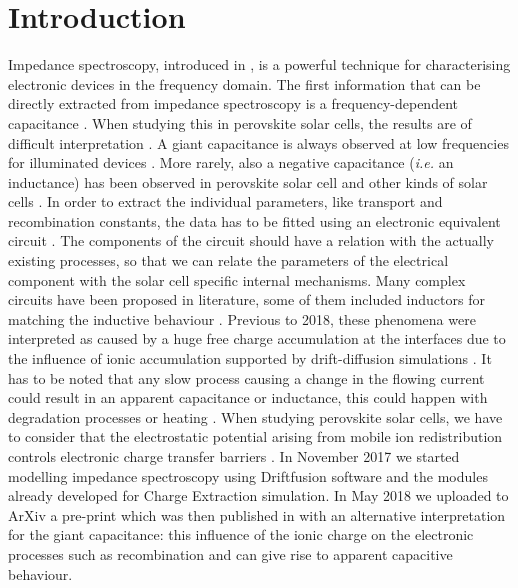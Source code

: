 
\section{Introduction}
	Impedance spectroscopy, introduced in , is a powerful technique for characterising electronic devices in the frequency domain.
	The first information that can be directly extracted from impedance spectroscopy is a frequency\hyp{}dependent capacitance \cite{Brus2016}.
	When studying this in perovskite solar cells, the results are of difficult interpretation \cite{Almora2018,Guillen2014}.
	A giant capacitance is always observed at low frequencies for illuminated devices \cite{Juarez-Perez2014,Kim2015c}.
	More rarely, also a negative capacitance (\textsl{i.e.} an inductance) has been observed in perovskite solar cell \cite{Ghahremanirad2017,Guerrero2016,Sanchez2014} and other kinds of solar cells \cite{Mora-Sero2006,Knapp2015}.
	In order to extract the individual parameters, like transport and recombination constants, the data has to be fitted using an electronic equivalent circuit \cite{Jamnik2001}.
	The components of the circuit should have a relation with the actually existing processes, so that we can relate the parameters of the electrical component with the solar cell specific internal mechanisms.
	Many complex circuits have been proposed in literature, some of them included inductors for matching the inductive behaviour \cite{Almora2018,Ghahremanirad2017,Guerrero2016}.
	Previous to 2018, these phenomena were interpreted as caused by a huge free charge accumulation at the interfaces due to the influence of ionic accumulation \cite{Guerrero2016,Zarazua2016a} supported by drift\hyp{}diffusion simulations \cite{Garcia-Rosell2018,Lopez-Varo2018}.
	It has to be noted that any slow process causing a change in the flowing current could result in an apparent capacitance or inductance, this could happen with degradation processes or heating \cite{Knapp2015,Shimizu2017}.
	When studying perovskite solar cells, we have to consider that the electrostatic potential arising from mobile ion redistribution controls electronic charge transfer barriers \cite{Tress2016,Pockett2017}.
	In November 2017 we started modelling impedance spectroscopy using Driftfusion software and the modules already developed for Charge Extraction simulation.
	In May 2018 we uploaded to ArXiv a pre-print which was then published in  with an alternative interpretation for the giant capacitance: this influence of the ionic charge on the electronic processes such as recombination and can give rise to apparent capacitive behaviour.
